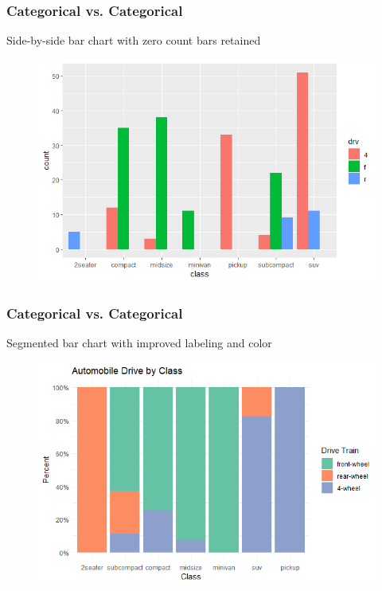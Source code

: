 \documentclass{beamer}
\begin{document}

\begin{frame}[fragile] %
\frametitle{Categorical vs. Categorical}

\begin{example} 
Side-by-side bar chart with zero count bars retained
\end{example}
\begin{figure}
\includegraphics[width=0.8\linewidth]{Seminar_3_images/R/03.png}
\end{figure}
\end{frame}


\begin{frame}[fragile] %
\frametitle{Categorical vs. Categorical}

\begin{example} 
Segmented bar chart with improved labeling and color

\end{example}
\begin{figure}
\includegraphics[width=0.75\linewidth]{Seminar_3_images/R/04.png}
\end{figure}
\end{frame}
\end{document}
